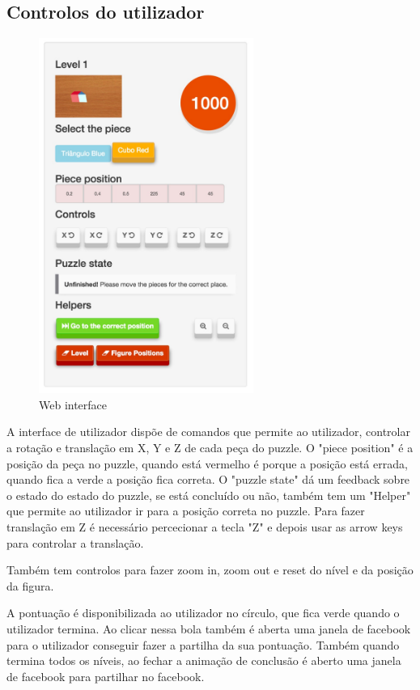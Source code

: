 \documentclass[pdftex,12pt,a4paper]{report}
\begin{document}
\subsection{Controlos do utilizador}

\begin{figure}[!htb]
\center
 \includegraphics[width=70mm,scale=1]{webuserinterface.pdf}
 \caption{Web interface}
 \label{fig:web_interface}
\end{figure}

A interface de utilizador dispõe de comandos que permite ao utilizador, controlar a rotação e translação em X, Y e Z de cada peça do puzzle. O "piece position" é a posição da peça no puzzle, quando está vermelho é porque a posição está errada, quando fica a verde a posição fica correta. O "puzzle state" dá um feedback sobre o estado do estado do puzzle, se está concluído ou não, também tem um "Helper" que permite ao utilizador ir para a posição correta no puzzle. Para fazer translação em Z é necessário percecionar a tecla "Z" e depois usar as arrow keys para controlar a translação.

Também tem controlos para fazer zoom in, zoom out e reset do nível e da posição da figura.

A pontuação é disponibilizada ao utilizador no círculo, que fica verde quando o utilizador termina. Ao clicar nessa bola também é aberta uma janela de facebook para o utilizador conseguir fazer a partilha da sua pontuação. Também quando termina todos os níveis, ao fechar a animação de conclusão é aberto uma janela de facebook para partilhar no facebook.
\end{document}
